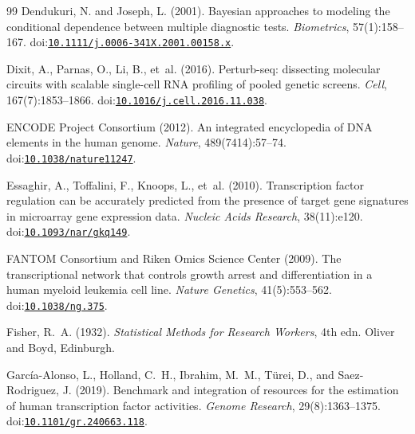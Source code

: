 \documentclass[11pt,a4paper]{article}
\begin{document}
\begin{thebibliography}{99}
Dendukuri, N. and Joseph, L. (2001).
\newblock Bayesian approaches to modeling the conditional dependence between multiple diagnostic tests.
\newblock \emph{Biometrics}, 57(1):158--167.
\newblock doi:\href{https://doi.org/10.1111/j.0006-341X.2001.00158.x}{\nolinkurl{10.1111/j.0006-341X.2001.00158.x}}.

Dixit, A., Parnas, O., Li, B., et~al. (2016).
\newblock Perturb-seq: dissecting molecular circuits with scalable single-cell {RNA} profiling of pooled genetic screens.
\newblock \emph{Cell}, 167(7):1853--1866.
\newblock doi:\href{https://doi.org/10.1016/j.cell.2016.11.038}{\nolinkurl{10.1016/j.cell.2016.11.038}}.

{ENCODE Project Consortium} (2012).
\newblock An integrated encyclopedia of {DNA} elements in the human genome.
\newblock \emph{Nature}, 489(7414):57--74.
\newblock doi:\href{https://doi.org/10.1038/nature11247}{\nolinkurl{10.1038/nature11247}}.

Essaghir, A., Toffalini, F., Knoops, L., et~al. (2010).
\newblock Transcription factor regulation can be accurately predicted from the presence of target gene signatures in microarray gene expression data.
\newblock \emph{Nucleic Acids Research}, 38(11):e120.
\newblock doi:\href{https://doi.org/10.1093/nar/gkq149}{\nolinkurl{10.1093/nar/gkq149}}.

{FANTOM Consortium and Riken Omics Science Center} (2009).
\newblock The transcriptional network that controls growth arrest and differentiation in a human myeloid leukemia cell line.
\newblock \emph{Nature Genetics}, 41(5):553--562.
\newblock doi:\href{https://doi.org/10.1038/ng.375}{\nolinkurl{10.1038/ng.375}}.

Fisher, R.~A. (1932).
\newblock \emph{Statistical Methods for Research Workers}, 4th edn.
\newblock Oliver and Boyd, Edinburgh.

Garc{\'i}a-Alonso, L., Holland, C.~H., Ibrahim, M.~M., T{\"u}rei, D., and Saez-Rodriguez, J. (2019).
\newblock Benchmark and integration of resources for the estimation of human transcription factor activities.
\newblock \emph{Genome Research}, 29(8):1363--1375.
\newblock doi:\href{https://doi.org/10.1101/gr.240663.118}{\nolinkurl{10.1101/gr.240663.118}}.


\end{thebibliography}
\end{document}
